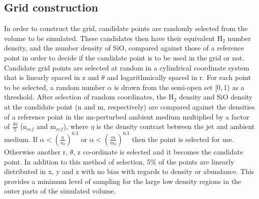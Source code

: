 \documentclass[useAMS,usenatbib]{mn2e}
\begin{document}
\subsection{Grid construction} \label{subsec:gridding}
In order to construct the grid, candidate points are randomly selected from the volume to be simulated. These candidates then have their equivalent H$_2$ number density, and the number density of SiO, compared against those of a reference point in order to decide if the candidate point is to be used in the grid or not. Candidate grid points are selected at random in a cylindrical coordinate system that is linearly spaced in z and $\theta$ and logarithmically spaced in r. For each point to be selected, a random number $\alpha$ is drawn from the semi-open set [0,$\,$1) as a threshold. After selection of random coordinates, the H$_2$ density and SiO density at the candidate point (n and m, respectively) are compared against the densities of a reference point in the un-perturbed ambient medium multiplied by a factor of $\frac{4\eta}{5}$ (n$_{ref}$ and m$_{ref}$), where $\eta$ is the density contrast between the jet and ambient medium. If $\alpha<\left( \frac{n}{n_0} \right)^{0.3}$ or $\alpha< \left( \frac{m}{m_0} \right)^{0.3}$ then the point is selected for use. Otherwise another r, $\theta$, z co-ordinate is selected and it becomes the candidate point. In addition to this method of selection, 5\% of the points are linearly distributed in x, y and z with no bias with regards to density or abundance. This provides a minimum level of sampling for the large low density regions in the outer parts of the simulated volume. %
\smallskip
\end{document}
